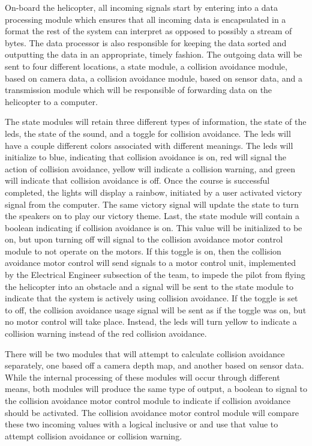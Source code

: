 \documentclass[onecolumn, draftclsnofoot, 10pt, compsoc]{IEEEtran}
\begin{document}
On-board the helicopter, all incoming signals start by entering into a data processing module which ensures that all incoming data is encapsulated in a format the rest of the system can interpret as opposed to possibly a stream of bytes. The data processor is also responsible for keeping the data sorted and outputting the data in an appropriate, timely fashion. The outgoing data will be sent to four different locations, a state module, a collision avoidance module, based on camera data, a collision avoidance module, based on sensor data, and a transmission module which will be responsible of forwarding data on the helicopter to a computer.

The state modules will retain three different types of information, the state of the leds, the state of the sound, and a toggle for collision avoidance. The leds will have a couple different colors associated with different meanings. The leds will initialize to blue, indicating that collision avoidance is on, red will signal the action of collision avoidance, yellow will indicate a collision warning, and green will indicate that collision avoidance is off. Once the course is successful completed, the lights will display a rainbow, initiated by a user activated victory signal from the computer. The same victory signal will update the state to turn the speakers on to play our victory theme. Last, the state module will contain a boolean indicating if collision avoidance is on. This value will be initialized to be on, but upon turning off will signal to the collision avoidance motor control module to not operate on the motors. If this toggle is on, then the collision avoidance motor control will send signals to a motor control unit, implemented by the Electrical Engineer subsection of the team, to impede the pilot from flying the helicopter into an obstacle and a signal will be sent to the state module to indicate that the system is actively using collision avoidance. If the toggle is set to off, the collision avoidance usage signal will be sent as if the toggle was on, but no motor control will take place. Instead, the leds will turn yellow to indicate a collision warning instead of the red collision avoidance.

There will be two modules that will attempt to calculate collision avoidance separately, one based off a camera depth map, and another based on sensor data. While the internal processing of these modules will occur through different means, both modules will produce the same type of output, a boolean to signal to the collision avoidance motor control module to indicate if collision avoidance should be activated. The collision avoidance motor control module will compare these two incoming values with a logical inclusive or and use that value to attempt collision avoidance or collision warning.
\end{document}
